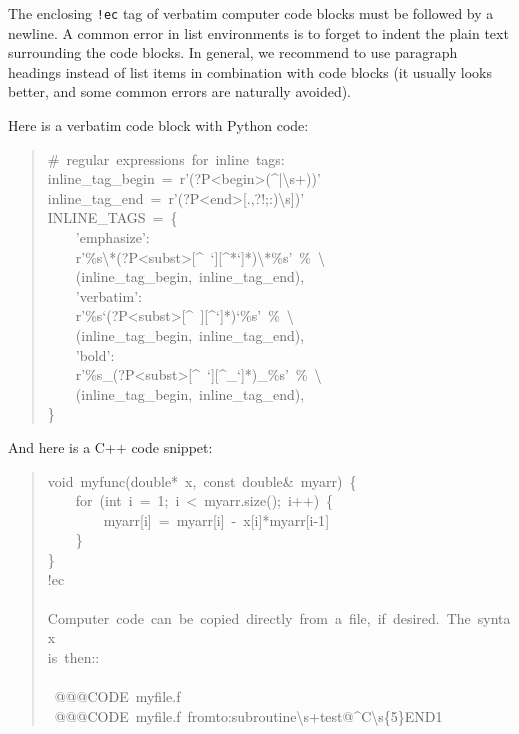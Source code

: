 \documentclass[a4paper,english]{article}
\begin{document}




The enclosing \texttt{!ec} tag of verbatim computer code blocks must
be followed by a newline.  A common error in list environments is to
forget to indent the plain text surrounding the code blocks. In
general, we recommend to use paragraph headings instead of list items
in combination with code blocks (it usually looks better, and some
common errors are naturally avoided).

Here is a verbatim code block with Python code:
%
\begin{quote}{\ttfamily \raggedright \noindent
\#~regular~expressions~for~inline~tags:\\
inline\_tag\_begin~=~r'(?P<begin>(\textasciicircum{}|\textbackslash{}s+))'\\
inline\_tag\_end~=~r'(?P<end>{[}.,?!;:)\textbackslash{}s{]})'\\
INLINE\_TAGS~=~\{\\
~~~~'emphasize':\\
~~~~r'\%s\textbackslash{}*(?P<subst>{[}\textasciicircum{}~`{]}{[}\textasciicircum{}*`{]}*)\textbackslash{}*\%s'~\%~\textbackslash{}\\
~~~~(inline\_tag\_begin,~inline\_tag\_end),\\
~~~~'verbatim':\\
~~~~r'\%s`(?P<subst>{[}\textasciicircum{}~{]}{[}\textasciicircum{}`{]}*)`\%s'~\%~\textbackslash{}\\
~~~~(inline\_tag\_begin,~inline\_tag\_end),\\
~~~~'bold':\\
~~~~r'\%s\_(?P<subst>{[}\textasciicircum{}~`{]}{[}\textasciicircum{}\_`{]}*)\_\%s'~\%~\textbackslash{}\\
~~~~(inline\_tag\_begin,~inline\_tag\_end),\\
\}
}
\end{quote}

And here is a C++ code snippet:
%
\begin{quote}{\ttfamily \raggedright \noindent
void~myfunc(double*~x,~const~double\&~myarr)~\{\\
~~~~for~(int~i~=~1;~i~<~myarr.size();~i++)~\{\\
~~~~~~~~myarr{[}i{]}~=~myarr{[}i{]}~-~x{[}i{]}*myarr{[}i-1{]}\\
~~~~\}\\
\}\\
!ec\\
~\\
Computer~code~can~be~copied~directly~from~a~file,~if~desired.~The~syntax\\
is~then::\\
~\\
~@@@CODE~myfile.f\\
~@@@CODE~myfile.f~fromto:subroutine\textbackslash{}s+test@\textasciicircum{}C\textbackslash{}s\{5\}END1
}
\end{quote}
\end{document}
